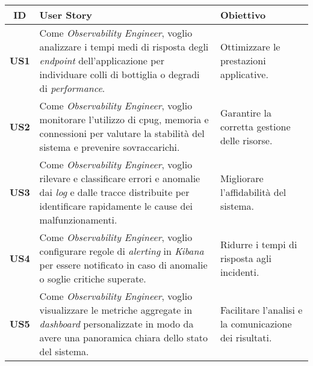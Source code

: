 \begin{center}
\label{tab:user-stories}
\begin{tabularx}{\textwidth}{|c|X|X|}
\hline
\rowcolor[gray]{0.8}
\textbf{ID} & \textbf{User Story} & \textbf{Obiettivo} \\
\hline
\textbf{US1} & Come \emph{Observability Engineer}, voglio analizzare i tempi medi di risposta degli \emph{endpoint} dell'applicazione per individuare colli di bottiglia o degradi di \emph{performance}. & Ottimizzare le prestazioni applicative. \\
\hline
\textbf{US2} & Come \emph{Observability Engineer}, voglio monitorare l'utilizzo di \gls{cpug}, memoria e connessioni per valutare la stabilità del sistema e prevenire sovraccarichi. & Garantire la corretta gestione delle risorse. \\
\hline
\textbf{US3} & Come \emph{Observability Engineer}, voglio rilevare e classificare errori e anomalie dai \emph{log} e dalle tracce distribuite per identificare rapidamente le cause dei malfunzionamenti. & Migliorare l'affidabilità del sistema. \\
\hline
\textbf{US4} & Come \emph{Observability Engineer}, voglio configurare regole di \emph{alerting} in \emph{Kibana} per essere notificato in caso di anomalie o soglie critiche superate. & Ridurre i tempi di risposta agli incidenti. \\
\hline
\textbf{US5} & Come \emph{Observability Engineer}, voglio visualizzare le metriche aggregate in \emph{dashboard} personalizzate in modo da avere una panoramica chiara dello stato del sistema. & Facilitare l'analisi e la comunicazione dei risultati. \\
\hline

\end{tabularx}
\end{center}

\vspace{1em}


